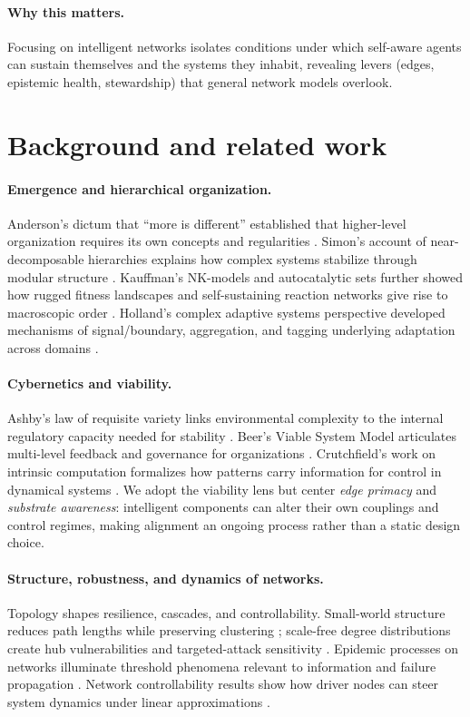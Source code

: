 \documentclass[12pt]{article}
\begin{document}
\paragraph{Why this matters.} Focusing on intelligent networks isolates conditions under which self-aware agents can sustain themselves and the systems they inhabit, revealing levers (edges, epistemic health, stewardship) that general network models overlook.
\section{Background and related work}
\paragraph{Emergence and hierarchical organization.}
Anderson’s dictum that ``more is different'' established that higher-level organization requires its own concepts and regularities \citep{Anderson1972}. Simon’s account of near-decomposable hierarchies explains how complex systems stabilize through modular structure \citep{Simon1962}. Kauffman’s NK-models and autocatalytic sets further showed how rugged fitness landscapes and self-sustaining reaction networks give rise to macroscopic order \citep{Kauffman1993}. Holland’s complex adaptive systems perspective developed mechanisms of signal/boundary, aggregation, and tagging underlying adaptation across domains \citep{Holland1992}.

\paragraph{Cybernetics and viability.}
Ashby’s law of requisite variety links environmental complexity to the internal regulatory capacity needed for stability \citep{Ashby1956}. Beer’s Viable System Model articulates multi-level feedback and governance for organizations \citep{Beer1972}. Crutchfield’s work on intrinsic computation formalizes how patterns carry information for control in dynamical systems \citep{Crutchfield1994}. We adopt the viability lens but center \emph{edge primacy} and \emph{substrate awareness}: intelligent components can alter their own couplings and control regimes, making alignment an ongoing process rather than a static design choice.

\paragraph{Structure, robustness, and dynamics of networks.}
Topology shapes resilience, cascades, and controllability. Small-world structure reduces path lengths while preserving clustering \citep{WattsStrogatz1998}; scale-free degree distributions create hub vulnerabilities and targeted-attack sensitivity \citep{Barabasi1999,Newman2003}. Epidemic processes on networks illuminate threshold phenomena relevant to information and failure propagation \citep{PastorSatorras2015}. Network controllability results show how driver nodes can steer system dynamics under linear approximations \citep{LiuSlotineBarabasi2011}.
\end{document}
